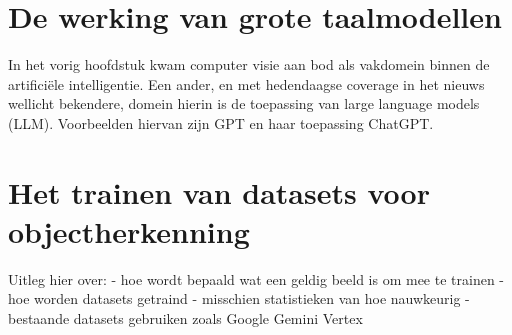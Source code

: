\section{De werking van grote taalmodellen}
\label{sec:ls-artificiele-intelligentie}
In het vorig hoofdstuk kwam computer visie aan bod als vakdomein binnen de artifici\"ele intelligentie.
Een ander, en met hedendaagse coverage in het nieuws wellicht bekendere, domein hierin is de toepassing van large language models (LLM).
Voorbeelden hiervan zijn GPT en haar toepassing ChatGPT. %

\section{Het trainen van datasets voor objectherkenning}\label{sec:datasets}
Uitleg hier over: %
- hoe wordt bepaald wat een geldig beeld is om mee te trainen
- hoe worden datasets getraind
- misschien statistieken van hoe nauwkeurig
- bestaande datasets gebruiken zoals Google Gemini Vertex

